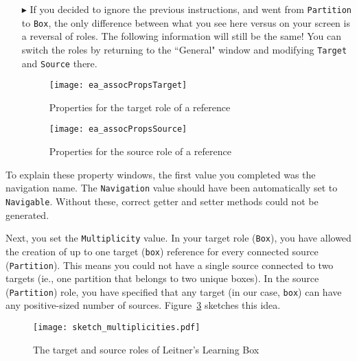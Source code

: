 \begin{itemize}
\vspace{0.5cm}

\item[$\blacktriangleright$] If you decided to ignore the previous instructions, and went from \texttt{Partition} to \texttt{Box}, the only difference between
what you see here versus on your screen is a reversal of roles. The following information will still be the same! You can switch the roles by returning to the 
``General" window and modifying \texttt{Target} and \texttt{Source} there. 
\vspace{1cm}

\begin{figure}[htbp]
	\centering
	  \texttt{[image: ea\_assocPropsTarget]}
	\caption{Properties for the target role of a reference}
	\label{fig:role_target}
\end{figure}
\FloatBarrier

\begin{figure}[htbp]
	\centering
    \texttt{[image: ea\_assocPropsSource]}
	\caption{Properties for the source role of a reference}
	\label{fig:role_source}
\end{figure}
\FloatBarrier

\end{itemize}

To explain these property windows, the first value you completed was the navigation name. The \texttt{Navigation} value should have been automatically set to
\texttt{Navigable}. Without these, correct getter and setter methods could not be generated.

\vspace{0.5cm}

Next, you set the \texttt{Multiplicity} value. In your target role (\texttt{Box}), you have allowed the creation of up to
one target (\texttt{box}) reference for every connected source (\texttt{Partition}). This means you could not have a single source connected to two targets
(ie., one partition that belongs to two unique boxes). In the source (\texttt{Partition}) role, you have specified that any target (in our case, \texttt{box})
can have any positive-sized number of sources. Figure~\ref{fig:sketch_roles} sketches this idea.

\begin{figure}[htbp]
	\centering
    \texttt{[image: sketch\_multiplicities.pdf]}
	\caption{The target and source roles of Leitner's Learning Box}
	\label{fig:sketch_roles}
\end{figure}
\FloatBarrier

